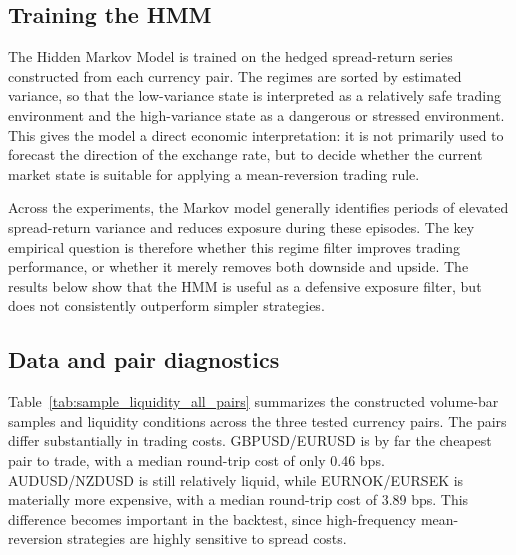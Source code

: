 \subsection{Training the HMM}

The Hidden Markov Model is trained on the hedged spread-return series constructed from each currency pair. The regimes are sorted by estimated variance, so that the low-variance state is interpreted as a relatively safe trading environment and the high-variance state as a dangerous or stressed environment. This gives the model a direct economic interpretation: it is not primarily used to forecast the direction of the exchange rate, but to decide whether the current market state is suitable for applying a mean-reversion trading rule.

Across the experiments, the Markov model generally identifies periods of elevated spread-return variance and reduces exposure during these episodes. The key empirical question is therefore whether this regime filter improves trading performance, or whether it merely removes both downside and upside. The results below show that the HMM is useful as a defensive exposure filter, but does not consistently outperform simpler strategies.

\subsection{Data and pair diagnostics}

Table~\ref{tab:sample_liquidity_all_pairs} summarizes the constructed volume-bar samples and liquidity conditions across the three tested currency pairs. The pairs differ substantially in trading costs. GBPUSD/EURUSD is by far the cheapest pair to trade, with a median round-trip cost of only 0.46 bps. AUDUSD/NZDUSD is still relatively liquid, while EURNOK/EURSEK is materially more expensive, with a median round-trip cost of 3.89 bps. This difference becomes important in the backtest, since high-frequency mean-reversion strategies are highly sensitive to spread costs.

